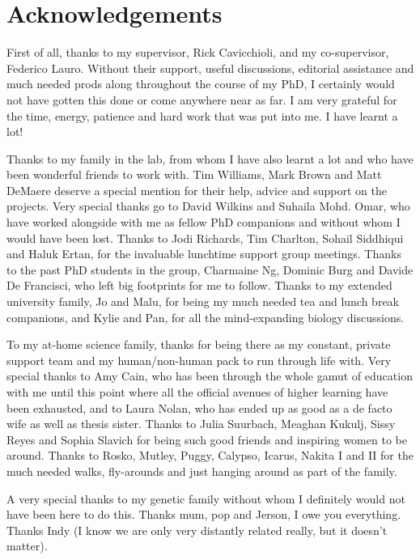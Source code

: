 \chapter*{Acknowledgements}
First of all, thanks to my supervisor, Rick Cavicchioli, and my co-supervisor, Federico Lauro.
Without their support, useful discussions, editorial assistance and much needed prods along throughout the course of my PhD, I certainly would not have gotten this done or come anywhere near as far.
I am very grateful for the time, energy, patience and hard work that was put into me.
I have learnt a lot!

Thanks to my family in the lab, from whom I have also learnt a lot and who have been wonderful friends to work with.
Tim Williams, Mark Brown and Matt DeMaere deserve a special mention for their help, advice and support on the projects.
Very special thanks go to David Wilkins and Suhaila Mohd. Omar, who have worked alongside with me as fellow PhD companions and without whom I would have been lost.
Thanks to Jodi Richards, Tim Charlton, Sohail Siddhiqui and Haluk Ertan, for the invaluable lunchtime support group meetings.
Thanks to the past PhD students in the group, Charmaine Ng, Dominic Burg and Davide De Francisci, who left big footprints for me to follow.
Thanks to my extended university family, Jo and Malu, for being my much needed tea and lunch break companions, and Kylie and Pan, for all the mind-expanding biology discussions.

To my at-home science family, thanks for being there as my constant, private support team and my human/non-human pack to run through life with.
Very special thanks to Amy Cain, who has been through the whole gamut of education with me until this point where all the official avenues of higher learning have been exhausted, and to Laura Nolan, who has ended up as good as a de facto wife as well as thesis sister.
Thanks to Julia Suurbach, Meaghan Kukulj, Sissy Reyes and Sophia Slavich for being such good friends and inspiring women to be around.
Thanks to Rosko, Mutley, Puggy, Calypso, Icarus, Nakita I and II for the much needed walks, fly-arounds and just hanging around as part of the family.

A very special thanks to my genetic family without whom I definitely would not have been here to do this.
Thanks mum, pop and Jerson, I owe you everything.
Thanks Indy (I know we are only very distantly related really, but it doesn't matter).
